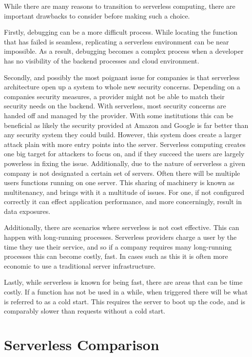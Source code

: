 \documentclass[10pt, conference]{IEEEtran}
\begin{document}
While there are many reasons to transition to serverless computing, there are important drawbacks to consider before making such a choice. 

Firstly, debugging can be a more difficult process. While locating the function that has failed is seamless, replicating a serverless environment can be near impossible. As a result, debugging becomes a complex process when a developer has no visibility of the backend processes and cloud environment.

Secondly, and possibly the most poignant issue for companies is that serverless architecture open up a system to whole new security concerns. Depending on a companies security measures, a provider might not be able to match their security needs on the backend. With serverless, most security concerns are handed off and managed by the provider. With some institutions this can be beneficial as likely the security provided at Amazon and Google is far better than any security system they could build. However, this system does create a larger attack plain with more entry points into the server. Serverless computing creates one big target for attackers to focus on, and if they succeed the users are largely powerless in fixing the issue. Additionally, due to the nature of serverless a given company is not designated a certain set of servers. Often there will be multiple users functions running on one server. This sharing of machinery is known as multitenancy, and brings with it a multitude of issues. For one, if not configured correctly it can effect application performance, and more concerningly, result in data exposures. 

Additionally, there are scenarios where serverless is not cost effective. This can happen with long-running processes. Serverless providers charge a user by the time they use their service, and so if a company requires many long-running processes this can become costly, fast. In cases such as this it is often more economic to use a traditional server infrastructure. 

Lastly, while serverless is known for being fast, there are areas that can be time costly. If a function has not be used in a while, when triggered there will be what is referred to as a cold start. This requires the server to boot up the code, and is comparably slower than requests without a cold start. 

\section{Serverless Comparison}
\end{document}

